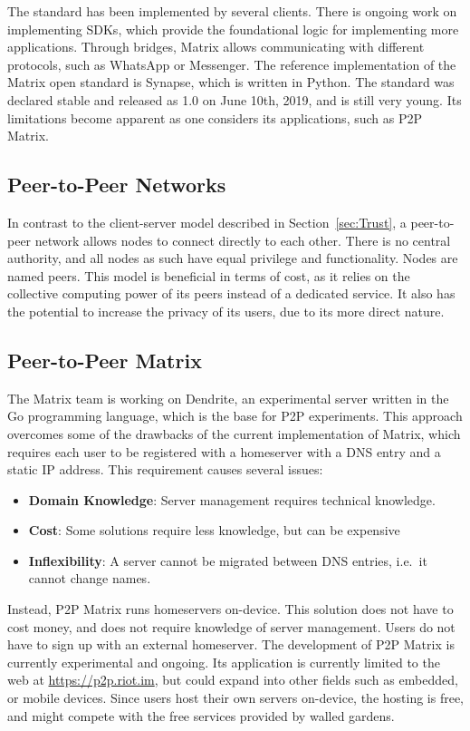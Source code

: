 The standard has been implemented by several clients\cite{matrix_org_clients}.
There is ongoing work on implementing SDKs\cite{matrix_org_sdks}, which provide the foundational logic for implementing more applications.
Through bridges, Matrix allows communicating with different protocols\cite{matrix_org_bridges}, such as WhatsApp or Messenger.
The reference implementation of the Matrix open standard is Synapse\cite{matrix_org_synapse}, which is written in Python.
The standard was declared stable and released as 1.0 on June 10th, 2019\cite{matrix_org_spec}, and is still very young.
Its limitations become apparent as one considers its applications, such as \ac{P2P} Matrix.

\subsection{Peer-to-Peer Networks}
In contrast to the client-server model described in Section~\ref{sec:Trust}, a peer-to-peer network allows nodes to connect directly to each other.
There is no central authority, and all nodes as such have equal privilege and functionality.
Nodes are named peers.
This model is beneficial in terms of cost, as it relies on the collective computing power of its peers instead of a dedicated service.
It also has the potential to increase the privacy of its users, due to its more direct nature.


\subsection{Peer-to-Peer Matrix}
The Matrix team is working on Dendrite\cite{matrix_org_dendrite}, an experimental server written in the Go programming language, which is the base for \ac{P2P} experiments.
This approach overcomes some of the drawbacks of the current implementation of Matrix, which requires each user to be registered with a homeserver with a \ac{DNS} entry and a static IP address.
This requirement causes several issues:
\begin{itemize}
	\item{
	      \textbf{Domain Knowledge}:
	      Server management requires technical knowledge.
	      }
	\item{
	      \textbf{Cost}:
	      Some solutions require less knowledge, but can be expensive     }
	\item{
	      \textbf{Inflexibility}:
	      A server cannot be migrated between \ac{DNS} entries, i.e.~it cannot change names.
	      }
\end{itemize}
Instead, \ac{P2P} Matrix runs homeservers on-device.
This solution does not have to cost money, and does not require knowledge of server management.
Users do not have to sign up with an external homeserver.
The development of \ac{P2P} Matrix is currently experimental and ongoing.
Its application is currently limited to the web at \url{https://p2p.riot.im}, but could expand into other fields such as embedded, or mobile devices.
Since users host their own servers on-device, the hosting is free, and might compete with the free services provided by walled gardens.

